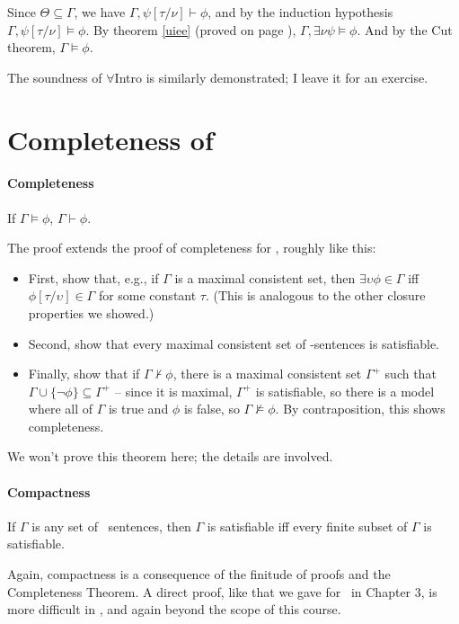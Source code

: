 Since $\Theta\subseteq\Gamma$, we have $\Gamma,\psi[\tau/\nu] \vdash \phi$, and by the induction hypothesis $\Gamma,\psi[\tau/\nu] \vDash \phi$.
By theorem \ref{uiee} (proved on page \pageref{uiee}), $\Gamma, \exists \nu\psi \vDash \phi$. And by the Cut theorem, $\Gamma\vDash \phi$.
 
The soundness of $\forall$Intro is similarly demonstrated; I leave it for an exercise.



\section{Completeness of \texorpdfstring{\ltwo}{L2}}
\paragraph{Completeness}

 \begin{theorem}
	If $\Gamma \vDash \phi$, $\Gamma \vdash \phi$.
\end{theorem}The proof extends the proof of completeness for \lone, roughly like this: \begin{itemize}
	\item First, show that, e.g., if $\Gamma$ is a maximal consistent set,  then $\exists \upsilon\phi \in \Gamma$ iff $\phi[\tau/\upsilon]\in \Gamma$ for some constant $\tau$. (This is analogous to the other closure properties we showed.)
	\item Second, show that every maximal consistent set of \ltwo-sentences is satisfiable.
	\item Finally, show that if $\Gamma \not\vdash\phi$, there is a maximal consistent set $\Gamma^{+}$ such that $\Gamma \cup \{\neg\phi\}\subseteq \Gamma^{+}$ – since it is maximal, $\Gamma^{+}$ is satisfiable, so there is a model where all of $\Gamma$ is true and $\phi$ is false, so $\Gamma\not\vDash\phi$. By contraposition, this shows completeness.
\end{itemize}
We won't prove this theorem here; the details are involved.

\paragraph{Compactness}

\begin{theorem}[Compactness]
	If $\Gamma$ is any set of \ltwo\ sentences, then $\Gamma$ is satisfiable iff every finite subset of $\Gamma$ is satisfiable.
\end{theorem}Again, compactness is  a consequence of the finitude of proofs and the Completeness Theorem. A direct proof, like that we gave for \lone\ in Chapter 3, is more difficult in \ltwo, and again beyond the scope of this course.


